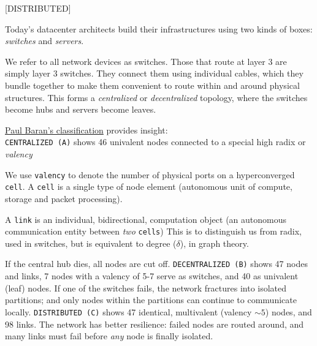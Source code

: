 \documentclass[../../../OAE-SPEC-MAIN.tex]{subfiles}
\begin{document}



[DISTRIBUTED]
 
Today's datacenter architects build their infrastructures using two kinds of boxes: \emph{switches} and \emph{servers}.

We refer to all network devices as switches. Those that route at layer 3 are simply layer 3 switches.
They connect them using individual cables, which they bundle together to make them convenient to route within and around physical structures. This forms a \emph{centralized} or \emph{decentralized}%
 topology, where the switches become hubs and servers become leaves.
 
\noindent \href{http://www.rand.org/about/history/baran.html}{Paul Baran's classification} %
provides insight:\\ \texttt{CENTRALIZED (A)} shows 46 univalent nodes connected to a %
special high radix or \emph{valency}

We use \texttt{valency} to denote the number of physical ports on a hyperconverged \texttt{cell}. A \texttt{cell} is a single type of node element (autonomous unit of compute, storage and packet processing). 

A \texttt{link} is an individual, bidirectional, computation object (an autonomous communication entity between  \emph{two} \texttt{cells}) This is to distinguish us from radix, used in switches, but is equivalent to degree ($\delta$), in graph theory.

If the central hub dies, all nodes are cut off.  \texttt{DECENTRALIZED (B)} shows 47 nodes and links, 7 nodes with a valency of  5-7 serve as switches, and 40 as univalent (leaf) nodes. If one of the switches fails, the network fractures into isolated partitions; and only nodes within the partitions can continue to communicate locally. \texttt{DISTRIBUTED (C)} shows 47 identical, multivalent (valency $\sim5$) nodes, and 98 links. The network has better resilience:  failed nodes are routed around, and many links must fail before \emph{any} node is finally isolated.
\end{document}
